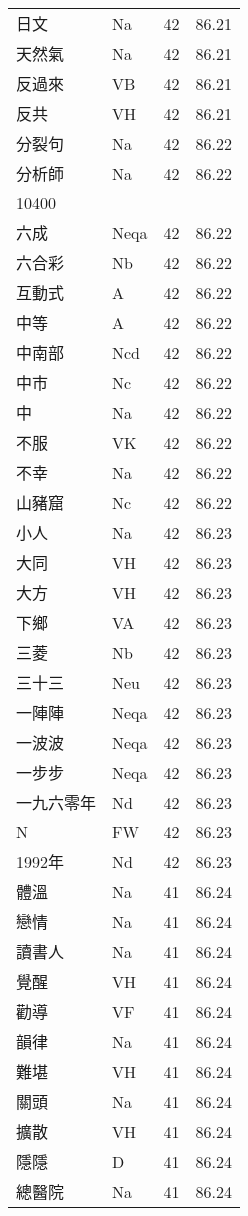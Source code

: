 \documentclass[twocolumn]{book}
\begin{document}
\begin{supertabular}{llrr}
日文 & Na & 42 &  86.21\\
天然氣 & Na & 42 &  86.21\\
反過來 & VB & 42 &  86.21\\
反共 & VH & 42 &  86.21\\
分裂句 & Na & 42 &  86.22\\
分析師 & Na & 42 &  86.22\\
10400\\
六成 & Neqa & 42 &  86.22\\
六合彩 & Nb & 42 &  86.22\\
互動式 & A & 42 &  86.22\\
中等 & A & 42 &  86.22\\
中南部 & Ncd & 42 &  86.22\\
中市 & Nc & 42 &  86.22\\
中 & Na & 42 &  86.22\\
不服 & VK & 42 &  86.22\\
不幸 & Na & 42 &  86.22\\
山豬窟 & Nc & 42 &  86.22\\
小人 & Na & 42 &  86.23\\
大同 & VH & 42 &  86.23\\
大方 & VH & 42 &  86.23\\
下鄉 & VA & 42 &  86.23\\
三菱 & Nb & 42 &  86.23\\
三十三 & Neu & 42 &  86.23\\
一陣陣 & Neqa & 42 &  86.23\\
一波波 & Neqa & 42 &  86.23\\
一步步 & Neqa & 42 &  86.23\\
一九六零年 & Nd & 42 &  86.23\\
N & FW & 42 &  86.23\\
1992年 & Nd & 42 &  86.23\\
體溫 & Na & 41 &  86.24\\
戀情 & Na & 41 &  86.24\\
讀書人 & Na & 41 &  86.24\\
覺醒 & VH & 41 &  86.24\\
勸導 & VF & 41 &  86.24\\
韻律 & Na & 41 &  86.24\\
難堪 & VH & 41 &  86.24\\
關頭 & Na & 41 &  86.24\\
擴散 & VH & 41 &  86.24\\
隱隱 & D & 41 &  86.24\\
總醫院 & Na & 41 &  86.24\\

\end{supertabular}
\end{document}
